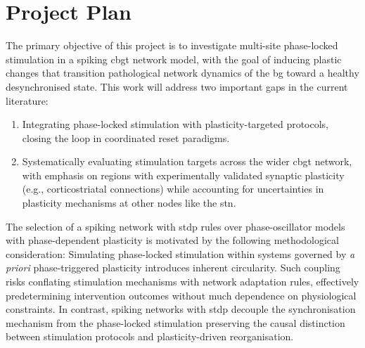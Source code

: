 \section{Project Plan}
The primary objective of this project is to investigate multi-site phase-locked stimulation in a spiking \acrshort{cbgt} network
model, with the goal of inducing plastic changes that transition pathological network dynamics of the \acrshort{bg} toward
a healthy desynchronised state. This work will address two important gaps in the current literature:
\begin{enumerate}[nosep]
	\item Integrating phase-locked stimulation with plasticity-targeted protocols, closing the loop in coordinated
	      reset paradigms.
	\item Systematically evaluating stimulation targets across the wider \acrshort{cbgt} network, with emphasis on regions with
	      experimentally validated synaptic plasticity (e.g., corticostriatal connections) while accounting for
	      uncertainties in plasticity mechanisms at other nodes like the \acrshort{stn}.
\end{enumerate}
The selection of a spiking network with \acrshort{stdp} rules over phase-oscillator models with phase-dependent plasticity is
motivated by the following methodological consideration:
Simulating phase-locked stimulation within systems governed by \textit{a priori} phase-triggered plasticity introduces
inherent circularity.
Such coupling risks conflating stimulation mechanisms with network adaptation rules, effectively predetermining
intervention outcomes without much dependence on physiological constraints.
In contrast, spiking networks with \acrshort{stdp} decouple the synchronisation mechanism from the phase-locked stimulation
preserving the causal distinction between stimulation protocols and plasticity-driven reorganisation.

